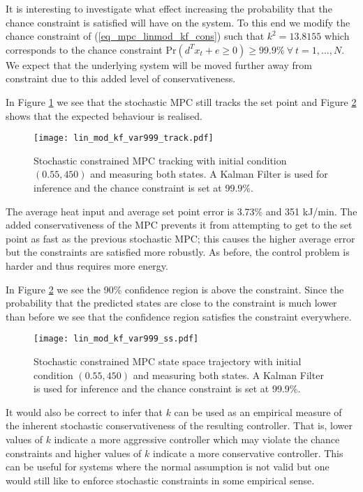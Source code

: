 It is interesting to investigate what effect increasing the probability that the chance constraint is satisfied will have on the system. To this end we modify the chance constraint of (\ref{eq_mpc_linmod_kf_cons}) such that $k^2 = 13.8155$ which corresponds to the chance constraint $\text{Pr}(d^Tx_t + e \geq 0) \geq 99.9\% ~\forall ~t=1,...,N$. We expect that the underlying system will be moved further away from constraint due to this added level of conservativeness.

In Figure \ref{fig_lin_mod_kf_var999_track} we see that the stochastic MPC still tracks the set point and Figure \ref{fig_lin_mod_kf_var999_ss} shows that the expected behaviour is realised. 
\begin{figure}[H] 
\centering
\texttt{[image: lin\_mod\_kf\_var999\_track.pdf]}
\caption{Stochastic constrained MPC tracking with initial condition $(0.55, 450)$ and measuring both states. A Kalman Filter is used for inference and the chance constraint is set at 99.9\%.}
\label{fig_lin_mod_kf_var999_track}
\end{figure}
The average heat input and average set point error is 3.73\% and 351 kJ/min. The added conservativeness of the MPC prevents it from attempting to get to the set point as fast as the previous stochastic MPC; this causes the higher average error but the constraints are satisfied more robustly. As before, the control problem is harder and thus requires more energy.

In Figure \ref{fig_lin_mod_kf_var999_ss} we see the 90\% confidence region is above the constraint. Since the probability that the predicted states are close to the constraint is much lower than before we see that the confidence region satisfies the constraint everywhere.
\begin{figure}[H] 
\centering
\texttt{[image: lin\_mod\_kf\_var999\_ss.pdf]}
\caption{Stochastic constrained MPC state space trajectory with initial condition $(0.55, 450)$ and measuring both states. A Kalman Filter is used for inference and the chance constraint is set at 99.9\%.}
\label{fig_lin_mod_kf_var999_ss}
\end{figure}
It would also be correct to infer that $k$ can be used as an empirical measure of the inherent stochastic conservativeness of the resulting controller. That is, lower values of $k$ indicate a more aggressive controller which may violate the chance constraints and higher values of $k$ indicate a more conservative controller. This can be useful for systems where the normal assumption is not valid but one would still like to enforce stochastic constraints in some empirical sense. 

